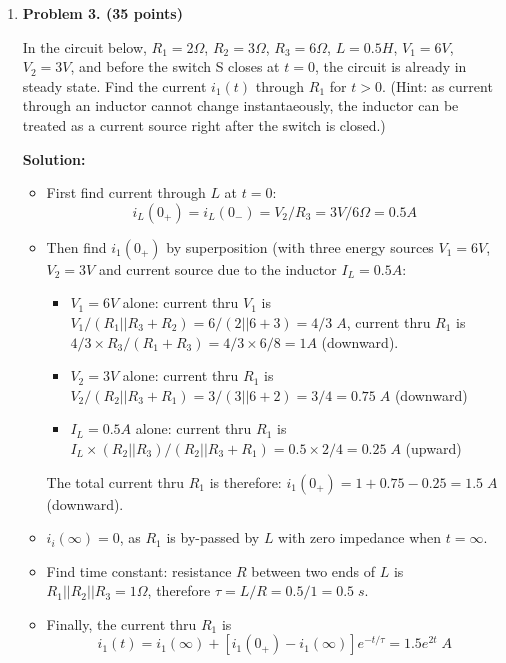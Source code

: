 \begin{enumerate}
\item {\bf Problem 3. (35 points)} 

In the circuit below, $R_1=2\Omega$, $R_2=3\Omega$, $R_3=6\Omega$, $L=0.5H$, 
$V_1=6V$, $V_2=3V$, and before the switch S closes at $t=0$, the circuit is 
already in steady state. Find the current $i_1(t)$ through $R_1$ for $t>0$.
(Hint: as current through an inductor cannot change instantaeously, the 
inductor can be treated as a current source right after the switch is closed.)


{\bf Solution:} 
\begin{itemize}
\item First find current through $L$ at $t=0$: 
  \[ i_L(0_+)=i_L(0_-)=V_2/R_3=3V/6\Omega=0.5A \]
\item Then find $i_1(0_+)$ by superposition (with three energy sources $V_1=6V$, 
  $V_2=3V$ and current source due to the inductor $I_L=0.5A$:
\begin{itemize}
  \item $V_1=6V$ alone:
    current thru $V_1$ is $ V_1/(R_1|| R_3+R_2)=6/(2||6+3)=4/3\;A$, current thru $R_1$ is
    $4/3 \times R_3/(R_1+R_3)=4/3 \times 6/8=1 A$ (downward).
  \item $V_2=3V$ alone: 
    current thru $R_1$ is $V_2/(R_2||R_3+R_1)=3/(3||6+2)=3/4=0.75 \;A $ (downward)
  \item $I_L=0.5A$ alone:
    current thru $R_1$ is $I_L \times (R_2||R_3)/(R_2||R_3+R_1)=0.5\times 2/4=0.25\;A$
    (upward)
\end{itemize}
The total current thru $R_1$ is therefore: $i_1(0_+)=1+0.75-0.25=1.5\;A$ (downward).
\item $i_i(\infty)=0$, as $R_1$ is by-passed by $L$ with zero impedance when $t=\infty$.
\item Find time constant: resistance $R$ between two ends of $L$ is $R_1||R_2||R_3=1\Omega$,
  therefore $\tau=L/R=0.5/1=0.5\;s$.
\item Finally, the current thru $R_1$ is 
  \[ i_1(t)=i_1(\infty)+[i_1(0_+)-i_1(\infty)] e^{-t/\tau}=1.5 e^{2t}\; A \]
\end{itemize}



\end{enumerate}



